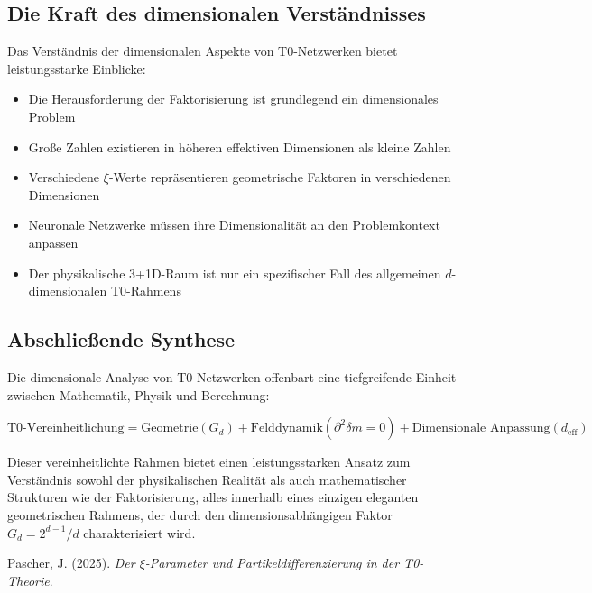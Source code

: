 \documentclass[12pt,a4paper]{article}
\newcommand{\xipar}{\ensuremath{\xi}}
\newcommand{\deltafield}{\ensuremath{\delta m}}
\begin{document}
	\subsection{Die Kraft des dimensionalen Verständnisses}
	\label{subsec:dimensional_understanding}
	
	Das Verständnis der dimensionalen Aspekte von T0-Netzwerken bietet leistungsstarke Einblicke:
	
	\begin{tcolorbox}[colback=yellow!5!white,colframe=orange!75!black,title=Zentrale dimensionale Erkenntnisse]
		\begin{itemize}
			\item Die Herausforderung der Faktorisierung ist grundlegend ein dimensionales Problem
			\item Große Zahlen existieren in höheren effektiven Dimensionen als kleine Zahlen
			\item Verschiedene $\xipar$-Werte repräsentieren geometrische Faktoren in verschiedenen Dimensionen
			\item Neuronale Netzwerke müssen ihre Dimensionalität an den Problemkontext anpassen
			\item Der physikalische 3+1D-Raum ist nur ein spezifischer Fall des allgemeinen $d$-dimensionalen T0-Rahmens
		\end{itemize}
	\end{tcolorbox}
	
	\subsection{Abschließende Synthese}
	\label{subsec:final_synthesis}
	
	Die dimensionale Analyse von T0-Netzwerken offenbart eine tiefgreifende Einheit zwischen Mathematik, Physik und Berechnung:
	
	\begin{equation}
		\boxed{\text{T0-Vereinheitlichung} = \text{Geometrie} (G_d) + \text{Felddynamik} (\partial^2\deltafield = 0) + \text{Dimensionale Anpassung} (d_{\text{eff}})}
	\end{equation}
	
	Dieser vereinheitlichte Rahmen bietet einen leistungsstarken Ansatz zum Verständnis sowohl der physikalischen Realität als auch mathematischer Strukturen wie der Faktorisierung, alles innerhalb eines einzigen eleganten geometrischen Rahmens, der durch den dimensionsabhängigen Faktor $G_d = 2^{d-1}/d$ charakterisiert wird.
	
	\begin{thebibliography}{9}
		
		Pascher, J. (2025). \textit{Der $\xi$-Parameter und Partikeldifferenzierung in der T0-Theorie}.
		
	\end{thebibliography}
	
\end{document}
